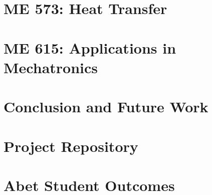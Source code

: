 \documentclass[12pt]{report}
\begin{document}
    \chapter{ME 573: Heat Transfer}
    

    \chapter{ME 615: Applications in Mechatronics}
    
    
    \chapter{Conclusion and Future Work}
    

    \appendix
    \chapter{Project Repository}
    \label{appendix:appendix_github}
    

    \chapter{Abet Student Outcomes}
    \label{appendix:appendix_abet}
    


    
\end{document}
